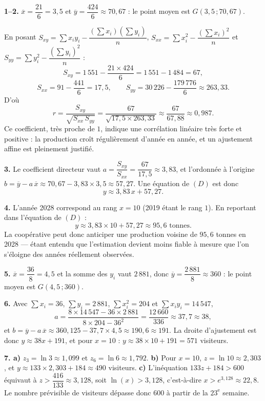 \begin{corrige}[annales]
\textbf{1--2.} $\overline{x} = \dfrac{21}{6} = 3{,}5$ et
$\overline{y} = \dfrac{424}{6} \approx 70{,}67$ : le point moyen est
$G(3{,}5\,;70{,}67)$.

En posant $S_{xy} = \sum x_{i}y_{i}-\dfrac{\left(\sum x_{i}\right)
\left(\sum y_{i}\right)}{n}$, $S_{xx} = \sum x_{i}^{2}
-\dfrac{\left(\sum x_{i}\right)^{2}}{n}$ et $S_{yy} = \sum y_{i}^{2}
-\dfrac{\left(\sum y_{i}\right)^{2}}{n}$ :
\[
  S_{xy} = 1\,551-\frac{21 \times 424}{6} = 1\,551-1\,484 = 67,
\]
\[
  S_{xx} = 91-\frac{441}{6} = 17{,}5, \qquad
  S_{yy} = 30\,226-\frac{179\,776}{6} \approx 263{,}33 .
\]
D'où
\[
  r = \frac{S_{xy}}{\sqrt{S_{xx}\,S_{yy}}}
  = \frac{67}{\sqrt{17{,}5 \times 263{,}33}}
  \approx \frac{67}{67{,}88} \approx 0{,}987 .
\]
Ce coefficient, très proche de $1$, indique une corrélation linéaire très
forte et positive : la production croît régulièrement d'année en année, et un
ajustement affine est pleinement justifié.

\textbf{3.} Le coefficient directeur vaut
$a = \dfrac{S_{xy}}{S_{xx}} = \dfrac{67}{17{,}5} \approx 3{,}83$, et
l'ordonnée à l'origine
$b = \overline{y}-a\,\overline{x} \approx 70{,}67-3{,}83 \times 3{,}5
\approx 57{,}27$. Une équation de $(D)$ est donc
\[
  y \approx 3{,}83\,x+57{,}27 .
\]

\textbf{4.} L'année 2028 correspond au rang $x = 10$ (2019 étant le rang
$1$). En reportant dans l'équation de $(D)$ :
\[
  y \approx 3{,}83 \times 10+57{,}27 \approx 95{,}6 \text{ tonnes}.
\]
La coopérative peut donc anticiper une production voisine de $95{,}6$
tonnes en 2028 — étant entendu que l'estimation devient moins fiable à
mesure que l'on s'éloigne des années réellement observées.

\textbf{5.} $\overline{x} = \dfrac{36}{8} = 4{,}5$ et la somme des $y_{i}$
vaut $2\,881$, donc $\overline{y} = \dfrac{2\,881}{8} \approx 360$ : le point
moyen est $G(4{,}5\,;360)$.

\textbf{6.} Avec $\sum x_{i} = 36$, $\sum y_{i} = 2\,881$,
$\sum x_{i}^{2} = 204$ et $\sum x_{i}y_{i} = 14\,547$,
\[
  a = \frac{8\times14\,547-36\times2\,881}{8\times204-36^{2}}
  = \frac{12\,660}{336} \approx 37{,}7 \approx 38,
\]
et $b = \overline{y}-a\,\overline{x} \approx 360{,}125-37{,}7\times4{,}5
\approx 190{,}6 \approx 191$. La droite d'ajustement est donc
$y \approx 38x+191$, et pour $x = 10$ :
$y \approx 38\times10+191 = 571$ visiteurs.

\textbf{7. a)} $z_{3} = \ln3 \approx 1{,}099$ et $z_{6} = \ln6 \approx
1{,}792$.
\textbf{b)} Pour $x = 10$, $z = \ln10 \approx 2{,}303$, et
$y \approx 133\times2{,}303+184 \approx 490$ visiteurs.
\textbf{c)} L'inéquation $133z+184>600$ équivaut à
$z > \dfrac{416}{133} \approx 3{,}128$, soit
$\ln(x) > 3{,}128$, c'est-à-dire $x > e^{3{,}128} \approx 22{,}8$. Le nombre
prévisible de visiteurs dépasse donc $600$ à partir de la $23^{\text{e}}$
semaine.
\end{corrige}

